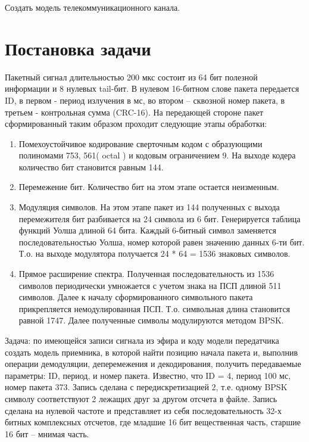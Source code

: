 \documentclass[12pt,a4paper]{scrartcl}
\begin{document}
Создать модель телекоммуникационного канала.\\

\section{Постановка задачи}
\label{sec:task}

Пакетный сигнал длительностью 200 мкс состоит из 64 бит полезной информации и 8 нулевых tail-бит. В нулевом 16-битном слове пакета передается ID, в первом - период излучения в мс, во втором – сквозной номер пакета, в третьем - контрольная сумма (CRC-16). На передающей стороне пакет сформированный таким образом проходит следующие этапы обработки:
\begin{enumerate}

\item Помехоустойчивое кодирование сверточным кодом с образующими полиномами 753, 561( octal ) и кодовым ограничением 9. На выходе кодера количество бит становится равным 144.
\item Перемежение бит. Количество бит на этом этапе остается неизменным.
\item Модуляция символов. На этом этапе пакет из 144 полученных с выхода перемежителя бит разбивается на 24 символа из 6 бит. Генерируется таблица функций Уолша длиной 64 бита. Каждый 6-битный символ заменяется последовательностью Уолша, номер которой равен значению данных 6-ти бит. Т.о. на выходе модулятора получается 24 * 64 = 1536 знаковых символов.
\item Прямое расширение спектра. Полученная последовательность из 1536 символов периодически умножается с учетом знака на ПСП длиной 511 символов. Далее к началу сформированного символьного пакета прикрепляется немодулированная ПСП. Т.о. символьная длина становится равной 1747. Далее полученные символы модулируются методом BPSK.
\end{enumerate}

Задача: по имеющейся записи сигнала из эфира и коду модели передатчика создать модель приемника, в которой найти позицию начала пакета и, выполнив операции демодуляции, деперемежения и декодирования, получить передаваемые параметры: ID, период, и номер пакета. Известно, что ID = 4, период 100 мс, номер пакета 373. Запись сделана с передискретизацией 2, т.е. одному BPSK символу соответствуют 2 лежащих друг за другом отсчета в файле. Запись сделана на нулевой частоте и представляет из себя последовательность 32-х битных комплексных отсчетов, где младшие 16 бит вещественная часть, старшие 16 бит – мнимая часть.
\end{document}
